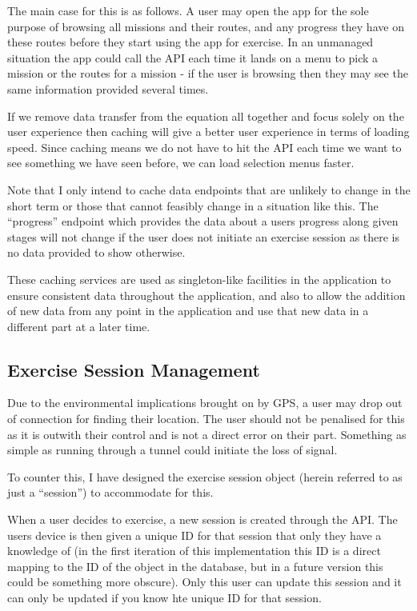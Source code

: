 The main case for this is as follows. A user may open the app for the
sole purpose of browsing all missions and their routes, and any
progress they have on these routes before they start using the app for
exercise. In an unmanaged situation the app could call the API each
time it lands on a menu to pick a mission or the routes for a mission
- if the user is browsing then they may see the same information
provided several times. 

If we remove data transfer from the equation all together and focus
solely on the user experience then caching will give a better user
experience in terms of loading speed. Since caching means we do not
have to hit the API each time we want to see something we have seen
before, we can load selection menus faster. 

Note that I only intend to cache data endpoints that are unlikely to
change in the short term or those that cannot feasibly change in a
situation like this. The ``progress'' endpoint which provides the data
about a users progress along given stages will not change if the user
does not initiate an exercise session as there is no data provided to
show otherwise. 

These caching services are used as singleton-like facilities in the
application to ensure consistent data throughout the application, and
also to allow the addition of new data from any point in the
application and use that new data in a different part at a later time.

\subsection{Exercise Session Management}
Due to the environmental implications brought on by GPS, a user may
drop out of connection for finding their location. The user should not
be penalised for this as it is outwith their control and is not a
direct error on their part. Something as simple as running through a
tunnel could initiate the loss of signal. 

To counter this, I have designed the exercise session object (herein
referred to as just a ``session'') to accommodate for this.

When a user decides to exercise, a new session is created through the
API. The users device is then given a unique ID for that session that
only they have a knowledge of (in the first iteration of this
implementation this ID is a direct mapping to the ID of the object in
the database, but in a future version this could be something more
obscure). Only this user can update this session and it can only be
updated if you know hte unique ID for that session. 

